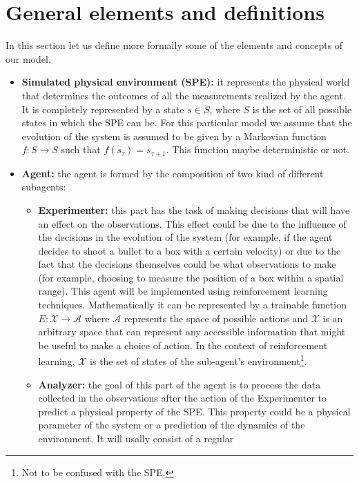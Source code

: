 \documentclass[11pt,a4paper,twoside]{report}
\newcommand{\+}{\textnormal{+} }
\theoremstyle{definition}
\numberwithin{equation}{chapter}
\begin{document}
\section{General elements and definitions}
In this section let us define more formally some of the elements and concepts of
our model.
\begin{itemize}
    \item \textbf{Simulated physical environment (SPE): } it represents the
    physical world that determines the outcomes of all the measurements realized
    by the agent. It is completely represented by a state $ s \in S $, where $S$
    is the set of all possible states in which the SPE can be. For this
    particular model we assume that the evolution of the system is assumed to be
    given by a Markovian function $f: S \rightarrow S$ such that
    $f(s_\tau)=s_{\tau+1}$. This function maybe deterministic or not.
    \item \textbf{Agent:} the agent is formed by the composition of two kind of
    different subagents:
    \begin{itemize}
        \item \textbf{Experimenter:} this part has the task of making decisions
        that will have an effect on the observations. This effect could be due
        to the influence of the decisions in the evolution of the system (for
        example, if the agent decides to shoot a bullet to a box with a certain
        velocity) or due to the fact that the decisions themselves could be what
        observations to make (for example, choosing to measure the position of a
        box within a spatial range). This agent will be implemented using
        reinforcement learning techniques. Mathematically it can be represented
        by a trainable function $E:\mathcal{X}\rightarrow\mathcal{A}$ where
        $\mathcal{A}$ represents the space of possible actions and $\mathcal{X}$
        is an arbitrary space that can represent any accessible information that
        might be useful to make a choice of action. In the context of
        reinforcement learning, $\mathcal{X}$ is the set of states of the
        sub-agent's environment\footnote{Not to be confused with the SPE.}.
        \item \textbf{Analyzer:} the goal of this part of the agent is to
        process the data collected in the observations after the action of the
        Experimenter to predict a physical property of the SPE. This property
        could be a physical parameter of the system or a prediction of the
        dynamics of the environment. It will usally consist of a regular

\end{itemize}
\end{itemize}
\end{document}
